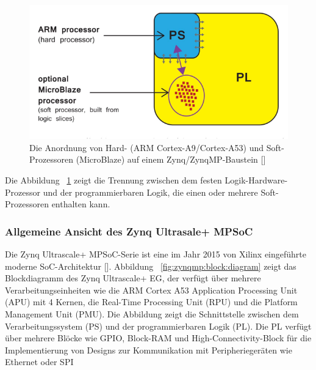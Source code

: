 \begin{figure}[H]
	\begin{center}
		\includegraphics[width=1\textwidth]{./images/ps-pl.jpg}
	\end{center}
	\vspace{-5pt}
	\caption[Hard-(ARM Cortex-A9/Cortex-A53) und Soft-Prozessoren (MicroBlaze)]{Die Anordnung von Hard- (ARM Cortex-A9/Cortex-A53) und Soft-Prozessoren (MicroBlaze) auf einem Zynq/ZynqMP-Baustein [\cite{Crockett:2001018}]}  %
	\label{fig:pl:ps}
	\vspace{-5pt}
\end{figure}


Die Abbildung ~\ref{fig:pl:ps} zeigt die Trennung zwischen dem festen Logik-Hardware-Prozessor und der programmierbaren Logik, die einen oder mehrere Soft-Prozessoren enthalten kann. 

\subsubsection{Allgemeine Ansicht des Zynq Ultrasale+ MPSoC}
Die Zynq Ultrascale+ MPSoC-Serie ist eine im Jahr 2015 von Xilinx eingeführte moderne SoC-Architektur [\cite{CNXSoftware}]. Abbildung ~\ref{fig:zynqmp:block:diagram} zeigt das Blockdiagramm des Zynq Ultrascale+ EG, der verfügt über mehrere Verarbeitungseinheiten wie die ARM Cortex A53 Application Processing Unit (APU) mit 4 Kernen, die Real-Time Processing Unit (RPU) und die Platform Management Unit (PMU). Die Abbildung zeigt die Schnittstelle zwischen dem Verarbeitungssystem (PS) und der programmierbaren Logik (PL). Die PL verfügt über mehrere Blöcke wie GPIO, Block-RAM und High-Connectivity-Block für die Implementierung von Designs zur Kommunikation mit Peripheriegeräten wie Ethernet oder SPI

